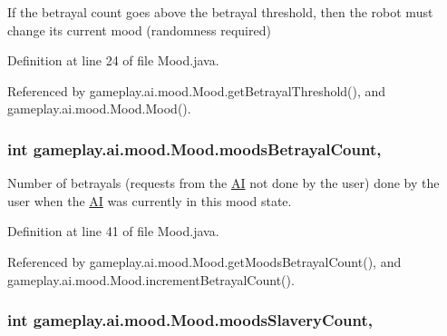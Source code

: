 If the betrayal count goes above the betrayal threshold, then the robot must change its current mood (randomness required) 



Definition at line 24 of file Mood.\-java.



Referenced by gameplay.\-ai.\-mood.\-Mood.\-get\-Betrayal\-Threshold(), and gameplay.\-ai.\-mood.\-Mood.\-Mood().

\hypertarget{classgameplay_1_1ai_1_1mood_1_1_mood_ae300727f17efc1d32e7cc1731f9935fa}{
\subsubsection[{moods\-Betrayal\-Count}]{\setlength{\rightskip}{0pt plus 5cm}int gameplay.\-ai.\-mood.\-Mood.\-moods\-Betrayal\-Count\hspace{0.3cm}{\ttfamily [protected]}, {\ttfamily [inherited]}}}\label{classgameplay_1_1ai_1_1mood_1_1_mood_ae300727f17efc1d32e7cc1731f9935fa}


Number of betrayals (requests from the \hyperlink{classgameplay_1_1ai_1_1_a_i}{A\-I} not done by the user) done by the user when the \hyperlink{classgameplay_1_1ai_1_1_a_i}{A\-I} was currently in this mood state. 



Definition at line 41 of file Mood.\-java.



Referenced by gameplay.\-ai.\-mood.\-Mood.\-get\-Moods\-Betrayal\-Count(), and gameplay.\-ai.\-mood.\-Mood.\-increment\-Betrayal\-Count().

\hypertarget{classgameplay_1_1ai_1_1mood_1_1_mood_a0bfc4bebdf6767b8c32e747ec21da39e}{
\subsubsection[{moods\-Slavery\-Count}]{\setlength{\rightskip}{0pt plus 5cm}int gameplay.\-ai.\-mood.\-Mood.\-moods\-Slavery\-Count\hspace{0.3cm}{\ttfamily [protected]}, {\ttfamily [inherited]}}}\label{classgameplay_1_1ai_1_1mood_1_1_mood_a0bfc4bebdf6767b8c32e747ec21da39e}



